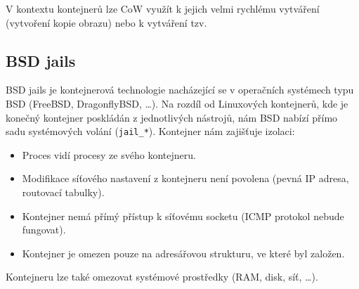 V kontextu kontejnerů lze CoW využít k jejich velmi rychlému vytváření (vytvoření kopie obrazu) nebo k vytváření tzv. 
\cite{fs_cow}

\subsection{BSD jails}

BSD jails je kontejnerová technologie nacházející se v operačních systémech typu BSD (FreeBSD, DragonflyBSD, \ldots).
Na rozdíl od Linuxových kontejnerů, kde je konečný kontejner poskládán z jednotlivých nástrojů, nám BSD nabízí přímo sadu systémových volání (\verb|jail_*|).
Kontejner nám zajišťuje izolaci:

\begin{itemize}
	\item Proces vidí procesy ze svého kontejneru.
	\item Modifikace síťového nastavení z kontejneru není povolena (pevná IP adresa, routovací tabulky).
	\item Kontejner nemá přímý přístup k síťovému socketu (ICMP protokol nebude fungovat).
	\item Kontejner je omezen pouze na adresářovou strukturu, ve které byl založen.
\end{itemize}

Kontejneru lze také omezovat systémové prostředky (RAM, disk, síť, \ldots).


